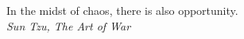 $\!$\\

\null
\vfill
\begin{flushright}
In the midst of chaos, there is also opportunity.  \\
\vspace{0.5cm}
\textit{Sun Tzu, The Art of War}
\end{flushright}

\thispagestyle{empty}

